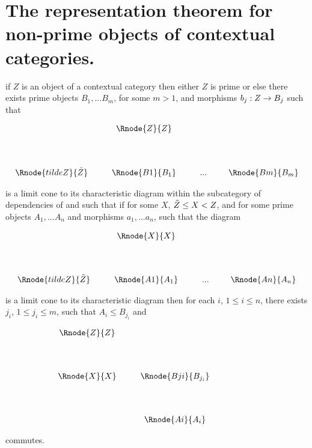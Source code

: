 \documentclass[10pt,a4paper]{scrartcl}
\begin{document}
\section{The representation theorem for non-prime objects of contextual categories.}
\begin{lemma}
if $Z$ is an object of a contextual category \ccat then either $Z$ is prime or else 
there exists prime objects $B_1,...B_m$, for some $m > 1$, and morphisms $b_j : Z \rightarrow B_j$ such that

\begin{center}
\begin{displaymath}
\begin{array}{cp{0.3cm}c         p{0.3cm}  c p{0.2cm} c}
               & & \Rnode{Z}{Z} & &     & &  \\ [1.4cm]
\Rnode{tildeZ}{\pbase{Z}}& &\Rnode{B1}{B_1}& & ... & &\Rnode{Bm}{B_m}
\end{array}
\end{displaymath}
\end{center}
\noindent
is a limit cone to its characteristic diagram within the subcategory of dependencies of \ccat and such that if for some $X$,
 $\tilde{Z} \leq X < Z$, and for some prime objects $A_1,...A_n$ and morphisms $a_1,...a_n$, such that the diagram
\begin{center}
\begin{displaymath}
\begin{array}{cp{0.3cm}c         p{0.3cm}  c p{0.2cm} c}
               & & \Rnode{X}{X} & &     & &  \\ [1.4cm]
\Rnode{tildeZ}{\pbase{Z}}& &\Rnode{A1}{A_1}& & ... & &\Rnode{An}{A_n}
\end{array}
\end{displaymath}
\end{center}
is a limit cone to its characteristic diagram then for each $i$, $1 \leq i \leq n$, there exists $j_i$, $1 \leq j_i \leq m$, such that
$A_i \leq B_{j_i}$ and
\begin{center}
\begin{displaymath}
\begin{array}{cp{0.3cm}c         p{0.3cm}  c p{0.2cm} c}
\Rnode{Z}{Z} & &     & & & &  \\ [1.4cm]
\Rnode{X}{X}& &\Rnode{Bji}{B_{j_i}}& &    & & \\[1.4cm]
            & &\Rnode{Ai}{A_i}     & &    & &
\end{array}
\end{displaymath}
\end{center}

commutes.
\end{lemma}
\end{document}
